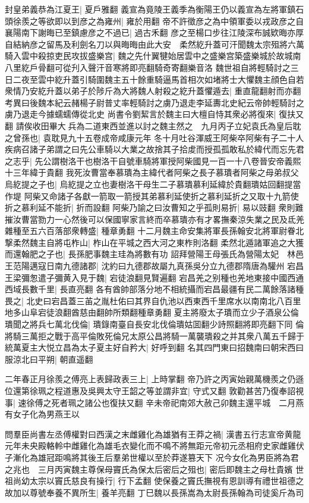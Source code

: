 封皇弟義恭為江夏王|{
	夏戶雅翻}
義宣為竟陵王義季為衡陽王仍以義宣為左將軍鎮石頭徐羨之等欲即以到彦之為雍州|{
	雍於用翻}
帝不許徵彦之為中領軍委以戎政彦之自襄陽南下謝晦已至鎮慮彦之不過已|{
	過古禾翻}
彦之至楊口步往江陵深布誠欵晦亦厚自結納彦之留馬及利劍名刀以與晦晦由此大安　柔然紇升蓋可汗聞魏太宗殂將六萬騎入雲中殺掠吏民攻拔盛樂宫|{
	魏之先什翼犍始居雲中之盛樂宫築盛樂城於故城南八里紇戶骨翻可從刋入聲汗音寒將即亮翻騎奇寄翻樂音洛}
魏世祖自將輕騎討之三日二夜至雲中紇升蓋引騎圍魏主五十餘重騎逼馬首相次如堵將士大懼魏主顔色自若衆情乃安紇升蓋以弟子於陟斤為大將魏人射殺之紇升蓋懼遁去|{
	重直龍翻射而亦翻　考異曰後魏本紀云赭楊子尉普丈率輕騎討之虜乃退走李延夀北史紀云帝帥輕騎討之虜乃退走今據蠕蠕傳從北史}
尚書令劉絜言於魏主曰大檀自恃其衆必將復來|{
	復扶又翻}
請俟收田畢大兵為二道東西並進以討之魏主然之　九月丙子立妃袁氏為皇后耽之曾孫也|{
	袁耽見九十五卷成帝咸康元年}
冬十月吐谷渾威王阿柴卒阿柴有子二十人疾病召諸子弟謂之曰先公車騎以大業之故捨其子拾䖍而授孤孤敢私於緯代而忘先君之志乎|{
	先公謂樹洛干也樹洛干自號車騎將軍授阿柴國見一百一十八卷晉安帝義熙十三年緯于貴翻}
我死汝曹當奉慕璝為主緯代者阿柴之長子慕璝者阿柴之母弟叔父烏紇提之子也|{
	烏紇提之立也妻樹洛干母生二子慕璝慕利延緯於貴翻璝姑回翻提當作堤}
阿柴又命諸子各獻一箭取一箭授其弟慕利延使折之慕利延折之又取十九箭使折之慕利延不能折|{
	折而設翻}
阿柴乃諭之曰汝曹知之乎孤則易折|{
	易以豉翻}
衆則難摧汝曹當勠力一心然後可以保國寧家言終而卒慕璝亦有才畧撫秦涼失業之民及氐羌雜種至五六百落部衆轉盛|{
	種章勇翻}
十二月魏主命安集將軍長孫翰安北將軍尉眷北撃柔然魏主自將屯柞山|{
	柞山在平城之西大河之東柞則洛翻}
柔然北遁諸軍追之大獲而還翰肥之子也|{
	長孫肥事魏主珪為將數有功}
詔拜營陽王母張氏為營陽太妃　林邑王范陽邁寇日南九德諸郡|{
	沈約曰九德郡故屬九真孫吳分立九德郡隋唐為驩州}
宕昌王梁彌怱遣子彌黄入見于魏|{
	宕徒浪翻見賢遍翻}
宕昌羌之别種也羌地東接中國西通西域長數千里|{
	長直亮翻}
各有酋帥部落分地不相統攝而宕昌最疆有民二萬餘落諸種畏之|{
	北史曰宕昌蓋三苖之胤杜佑曰其界自仇池以西東西千里席水以南南北八百里地多山阜宕徒浪翻酋慈由翻帥所類翻種章勇翻}
夏主將廢太子璝而立少子酒泉公倫璝聞之將兵七萬北伐倫|{
	璝錄南臺自長安北伐倫璝姑囬翻少詩照翻將即亮翻下同}
倫將騎三萬拒之戰于高平倫敗死倫兄太原公昌將騎一萬襲璝殺之并其衆八萬五千歸于統萬夏主大悦立昌為太子夏主好自矜大|{
	好呼到翻}
名其四門東曰招魏南曰朝宋西曰服涼北曰平朔|{
	朝直遥翻}


二年春正月徐羨之傅亮上表歸政表三上|{
	上時掌翻}
帝乃許之丙寅始親萬機羨之仍遜位還第徐珮之程道惠及吳興太守王韶之等並謂非宜|{
	守式又翻}
敦勸甚苦乃復奉詔視事|{
	速徐傅之死者珮之諸公也復扶又翻}
辛未帝祀南郊大赦己卯魏主還平城　二月燕有女子化為男燕王以

問羣臣尚書左丞傅權對曰西漢之末雌雞化為雄猶有王莽之禍|{
	漢書五行志宣帝黄龍元年未央殿輅軨中雌雞化為雄毛衣變化而不鳴不將無距元帝初元丞相府史家雌雞伏子漸化為雄冠距鳴將其後王后羣弟世權以至於莽遂篡天下}
况今女化為男臣將為君之兆也　三月丙寅魏主尊保母竇氏為保太后密后之殂也|{
	密后即魏主之母杜貴嬪}
世祖尚幼太宗以竇氏慈良有操行|{
	行下孟翻}
使保養之竇氏撫視有恩訓導有禮世祖德之故加以尊號奉養不異所生|{
	養羊亮翻}
丁巳魏以長孫嵩為太尉長孫翰為司徒奚斤為司

